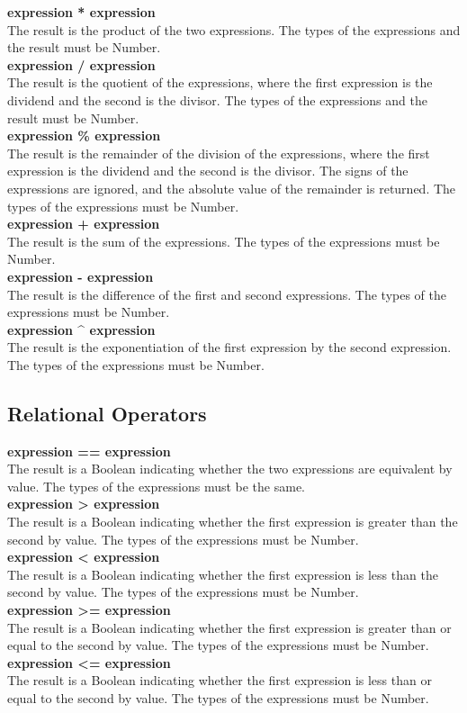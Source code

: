\documentclass[12pt]{report}
\begin{document}
    \textbf{expression * expression} \\
      The result is the product of the two expressions. The types of the expressions and the result must be Number. \\
    \textbf{expression / expression}\\
      The result is the quotient of the expressions, where the first expression is the dividend and the second is the divisor. The types of the expressions and the result must be Number. \\
    \textbf{expression \% expression}\\
      The result is the remainder of the division of the expressions, where the first expression is the dividend and the second is the divisor. The signs of the expressions are ignored, and the absolute value of the remainder is returned. The types of the expressions must be Number. \\
    \textbf{expression + expression}\\
      The result is the sum of the expressions. The types of the expressions must be Number. \\
    \textbf{expression - expression}\\
      The result is the difference of the first and second expressions. The types of the expressions must be Number. \\
    \textbf{expression \^{} expression}\\
      The result is the exponentiation of the first expression by the second expression. The types of the expressions must be Number. 

    
    \subsection*{Relational Operators}
    
    \textbf{expression == expression} \\
      The result is a Boolean indicating whether the two expressions are equivalent by value. The types of the expressions must be the same. \\
    \textbf{expression > expression}\\
      The result is a Boolean indicating whether the first expression is greater than the second by value. The types of the expressions must be Number. \\
    \textbf{expression < expression}\\
      The result is a Boolean indicating whether the first expression is less than the second by value. The types of the expressions must be Number. \\
    \textbf{expression >= expression}\\
      The result is a Boolean indicating whether the first expression is greater than or equal to the second by value. The types of the expressions must be Number. \\
    \textbf{expression <= expression}\\
      The result is a Boolean indicating whether the first expression is less than or equal to the second by value. The types of the expressions must be Number.
\end{document}
